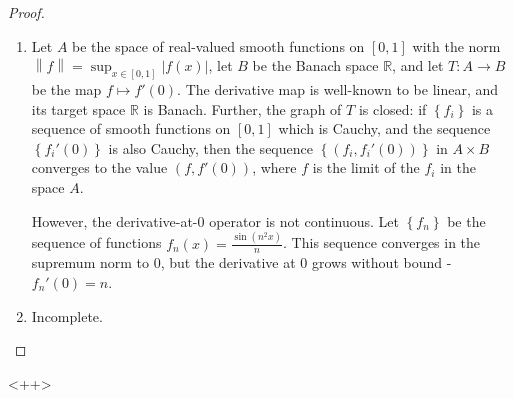 \documentclass[12pt]{article}
\newcommand{\R}{\mathbb{R}}
\theoremstyle{definition}
\begin{document}
\begin{proof}
	\begin{enumerate}[label=(\roman*)]
		\item Let $A$ be the space of real-valued smooth functions on $[0,1]$ with the norm $\left \lVert { f } \right \lVert  = \sup_{x \in [0,1]}\left \lvert { f(x) } \right \lvert $, let $B$ be the Banach space $\R$, and let $T: A \to B$ be the map $f \mapsto f'(0)$. The derivative map is well-known to be linear, and its target space $\R$ is Banach. Further, the graph of $T$ is closed: if $\left\{ f_i \right\}$ is a sequence of smooth functions on $[0,1]$ which is Cauchy, and the sequence $\left\{ f_i'(0) \right\}$ is also Cauchy, then the sequence $\left\{ (f_i, f_i'(0)) \right\}$ in $A \times B$ converges to the value $(f, f'(0))$, where $f$ is the limit of the $f_i$ in the space $A$. 
			\par However, the derivative-at-0 operator is not continuous. Let $\left\{ f_n \right\}$ be the sequence of functions $f_n(x) = \frac{\sin(n^2x)}{n}$. This sequence converges in the supremum norm to $0$, but the derivative at $0$ grows without bound - $f_n'(0) = n$. 
		\item Incomplete.
	\end{enumerate}
\end{proof}<++>
\begin{thebibliography}{}
\end{thebibliography}
\end{document}
